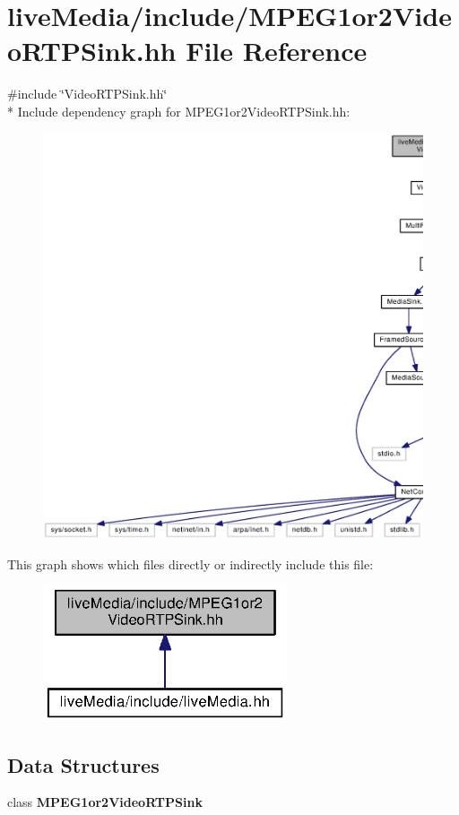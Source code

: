 \section{live\+Media/include/\+M\+P\+E\+G1or2\+Video\+R\+T\+P\+Sink.hh File Reference}
\label{MPEG1or2VideoRTPSink_8hh}
{\ttfamily \#include \char`\"{}Video\+R\+T\+P\+Sink.\+hh\char`\"{}}\\*
Include dependency graph for M\+P\+E\+G1or2\+Video\+R\+T\+P\+Sink.\+hh\+:
\nopagebreak
\begin{figure}[H]
\begin{center}
\leavevmode
\includegraphics[width=350pt]{MPEG1or2VideoRTPSink_8hh__incl}
\end{center}
\end{figure}
This graph shows which files directly or indirectly include this file\+:
\nopagebreak
\begin{figure}[H]
\begin{center}
\leavevmode
\includegraphics[width=204pt]{MPEG1or2VideoRTPSink_8hh__dep__incl}
\end{center}
\end{figure}
\subsection*{Data Structures}
\begin{DoxyCompactItemize}
\item 
class {\bf M\+P\+E\+G1or2\+Video\+R\+T\+P\+Sink}
\end{DoxyCompactItemize}
